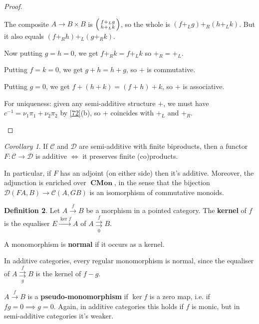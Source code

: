 \documentclass[a4paper]{article}
\theoremstyle{definition}
\newtheorem{definition}{Definition}
\theoremstyle{remark}
\theoremstyle{default}
\newtheorem{corollary}[definition]{Corollary}
\numberwithin{definition}{section}
\newcommand*\parallelpair[2]{\overset{#1}{\underset{#2}{\rightrightarrows}}}
\DeclareMathOperator{\CMon}{\textbf{CMon}}
\begin{document}
\begin{proof}
\begin{enumerate}[label=\alph*.]
		The composite $A \to B \times B$ is $\begin{psmallmatrix} f+_L g \\ h +_L k\end{psmallmatrix}$,
		so the whole is $(f+_L g)+_R(h+_Lk)$.
		But it also equals $(f+_R h)+_L(g+_R k)$.

		Now putting $g=h=0$, we get $f+_Rk=f+_Lk$ so $+_R = +_L$.
	
		Putting $f=k=0$, we get $g+h = h+g$, so $+$ is commutative.  
		
		Putting $g=0$, we get $f+(h+k) = (f+h)+k$, so $+$ is associative.
		
		For uniqueness: given any semi-additive structure $+$,
		we must have $c^{-1} = \nu_1 \pi_1 + \nu_2 \pi_2$ by \ref{72}(b),
		so $+$ coincides with $+_L$ and $+_R$.
	\end{enumerate}
\end{proof}

\begin{corollary}
	If $\mathcal{C}$ and $\mathcal{D}$ are semi-additive with finite biproducts,
	then a functor $F:\mathcal{C} \to \mathcal{D}$ is additive $\iff$ it preserves finite (co)products.
	
	In particular, if $F$ has an adjoint (on either side) then it's additive.
	Moreover, the adjunction is enriched over $\CMon$,
	in the sense that the bijection $\mathcal{D}(FA, B) \to \mathcal{C}(A, GB)$ is an isomorphism of commutative monoids.
\end{corollary}

\begin{definition}
	Let $A \overset{f}{\to} B$ be a morphism in a pointed category.
	The \textbf{kernel} of $f$ is the equaliser $E \overset{\ker f}{\longrightarrow} A$ of $A \parallelpair{f}{0} B$.
	
	A monomorphism is \textbf{normal} if it occurs as a kernel.
	
	In additive categories, every regular monomorphism is normal,
	since the equaliser of $A \parallelpair{f}{g} B$ is the kernel of $f-g$.
	
	$A \overset{f}{\to} B$ is a \textbf{pseudo-monomorphism} if $\ker f$ is a zero map,
	i.e. if $fg = 0 \implies g = 0$.
	Again, in additive categories this holds if $f$ is monic, but in semi-additive categories it's weaker.
\end{definition}
\end{document}
